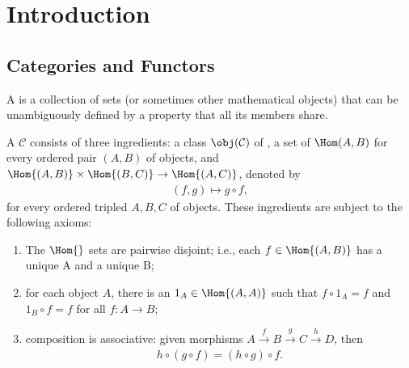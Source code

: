 \chapter{Introduction}\label{chapter:introduction}


\section{Categories and Functors}\label{sec:categories-and-functors}
    \begin{definition}\label{def:class}
        A  is a collection of sets (or sometimes other mathematical objects) that can be unambiguously defined by a property that all its members share.
    \end{definition}

    \begin{definition}\label{def:categories}
        A  $\mathcal{C}$ consists of three ingredients: a class $\obj({\mathcal{C})}$ of , a set of  $\Hom(A,B)$ for every ordered pair $(A,B)$ of objects, and  $\Hom{(A,B)} \times \Hom{(B,C)} \rightarrow \Hom{(A,C)}$, denoted by
            \begin{equation*}
            \begin{split}
                (f,g) \mapsto g\circ f,
            \end{split}
            \end{equation*}
        for every ordered tripled $A,B,C$ of objects. These ingredients are subject to the following axioms:
            \begin{enumerate}[label = (\arabic*)]
                \item The $\Hom{}$ sets are pairwise disjoint; i.e., each $f \in \Hom{(A,B)}$ has a unique  A and a unique  B;
                \item for each object $A$, there is an  $1_A \in \Hom{(A,A)}$ such that $f \circ 1_A = f$ and $1_B \circ f = f$ for all $f: A \rightarrow B$;
                \item composition is associative: given morphisms $A \xrightarrow{f} B \xrightarrow{g} C \xrightarrow{h} D$, then 
                    \begin{equation*}
                    \begin{split}
                        h\circ(g \circ f)=(h\circ g)\circ f.
                    \end{split}
                    \end{equation*}
            \end{enumerate}
    \end{definition}

